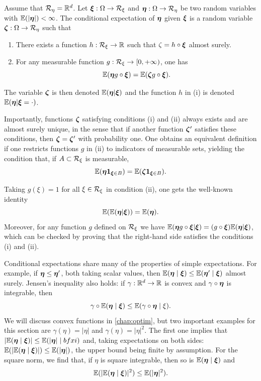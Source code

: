 \begin{definition}
\label{def:cond.exp}
Assume that ${\mathcal R}_\eta = {\mathbb{R}}^d$.
Let ${\bm{\xi}}: \Omega\to {\mathcal R}_\xi$ and ${\bm{\eta}}:\Omega \to {\mathcal R}_\eta$ be two random variables with  $\bm{\mathbb E}(|{\bm{\eta}}|) <\infty$. The conditional expectation of ${\bm{\eta}}$ given ${\bm{\xi}}$ is a random variable ${\bm{\zeta}}: \Omega \to {\mathcal R}_\eta$ such that
\begin{enumerate}[label = (\roman*),wide=0pt]
\item There exists a function $h: {\mathcal R}_\xi \to {\mathbb{R}}$ such that $\zeta = h 
\circ {\bm{\xi}}$ almost surely.
\item For any measurable function $g: {\mathcal R}_\xi \to [0, +\infty)$, one has
\[
\bm{\mathbb E}({\bm{\eta}} g\circ {\bm{\xi}}) = \bm{\mathbb E}({\bm{\zeta}} g\circ {\bm{\xi}}).
\]
\end{enumerate}
The variable ${\bm{\zeta}}$ is then denoted $\bm{\mathbb E}({\bm{\eta}}|{\bm{\xi}})$ and the function $h$ in (i) is denoted $\bm{\mathbb E}({\bm{\eta}}|{\bm{\xi}} = \cdot)$.
\end{definition}

Importantly, functions ${\bm{\zeta}}$ satisfying conditions (i) and (ii) always exists and are almost surely unique,  in the sense that if another function ${\bm{\zeta}}'$ satisfies these conditions, then ${\bm{\zeta}} = {\bm{\zeta}}'$ with probability one. One obtains an equivalent definition if one restricts functions $g$ in (ii) to indicators of measurable sets, yielding the condition that, if $A\subset {\mathcal R}_\xi$ is measurable,
\[
\bm{\mathbb E}({\bm{\eta}} {\bm 1}_{{\bm{\xi}}\in B} ) = \bm{\mathbb E}({\bm{\zeta}} {\bm 1}_{{\bm{\xi}}\in B}).
\]


Taking $g(\xi) = 1$ for all $\xi\in {\mathcal R}_\xi$ in condition (ii), one gets the well-known identity
\[
\bm{\mathbb E}(\bm{\mathbb E}({\bm{\eta}}|{\bm{\xi}})) = \bm{\mathbb E}({\bm{\eta}}).
\]
Moreover, for any function $g$ defined on ${\mathcal R}_\xi$ we have $\bm{\mathbb E}({\bm{\eta}} g\circ {\bm{\xi}}|{\bm{\xi}}) = (g\circ {\bm{\xi}})  \bm{\mathbb E}({\bm{\eta}}|{\bm{\xi}})$, which can be checked by proving that the right-hand side satisfies the conditions (i) and (ii).



Conditional expectations share many of the properties of simple expectations. For example, if ${\bm{\eta}} \leq {\bm{\eta}}'$, both taking scalar values, then $\bm{\mathbb E}({\bm{\eta}}\mid{\bm{\xi}}) \leq \bm{\mathbb E}({\bm{\eta}}'\mid {\bm{\xi}})$ almost surely. Jensen's inequality also holds: if $\gamma: {\mathbb{R}}^d\to {\mathbb{R}}$ is convex and $\gamma\circ {\bm{\eta}}$ is integrable, then
\[
\gamma\circ \bm{\mathbb E}({\bm{\eta}}\mid {\bm{\xi}}) \leq \bm{\mathbb E}(\gamma \circ {\bm{\eta}} \mid \xi).
\]
We will discuss convex functions in \cref{chap:optim}, but two important examples for this section are $\gamma(\eta) = |\eta|$ and $\gamma(\eta) = |\eta|^2$. The first one implies that $|\bm{\mathbb E}({\bm{\eta}}\mid {\bm{\xi}})| \leq \bm{\mathbb E}(|{\bm{\eta}}|\mid bfxi)$ and, taking expectations on both sides:  $\bm{\mathbb E}(|\bm{\mathbb E}({\bm{\eta}}\mid {\bm{\xi}})|) \leq \bm{\mathbb E}(|{\bm{\eta}}|)$, the upper bound being finite by assumption. For the square norm, we find that, if $\eta$ is square integrable, then so is $\bm{\mathbb E}({\bm{\eta}}\mid {\bm{\xi}})$ and 
\[
\bm{\mathbb E}(|\bm{\mathbb E}({\bm{\eta}}\mid {\bm{\xi}})|^2) \leq \bm{\mathbb E}(|{\bm{\eta}}|^2).
\]


